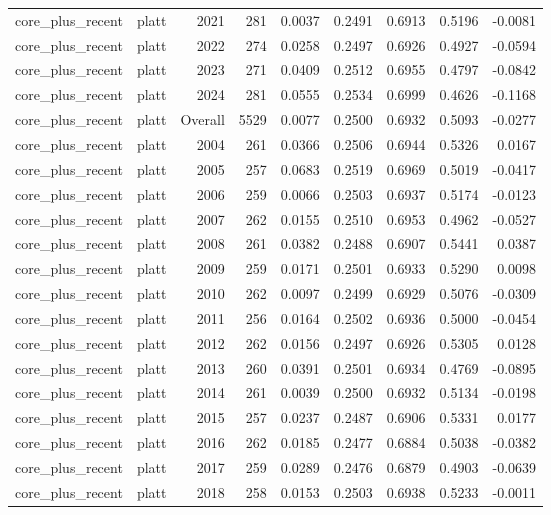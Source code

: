 \begin{table}[t]
\begin{tabular}{@{} l l r r r r r r r @{} }
      core\_plus\_recent & platt & 2021 & 281 & 0.0037 & 0.2491 & 0.6913 & 0.5196 & -0.0081 \\
      core\_plus\_recent & platt & 2022 & 274 & 0.0258 & 0.2497 & 0.6926 & 0.4927 & -0.0594 \\
      core\_plus\_recent & platt & 2023 & 271 & 0.0409 & 0.2512 & 0.6955 & 0.4797 & -0.0842 \\
      core\_plus\_recent & platt & 2024 & 281 & 0.0555 & 0.2534 & 0.6999 & 0.4626 & -0.1168 \\
      core\_plus\_recent & platt & Overall & 5529 & 0.0077 & 0.2500 & 0.6932 & 0.5093 & -0.0277 \\
      core\_plus\_recent & platt & 2004 & 261 & 0.0366 & 0.2506 & 0.6944 & 0.5326 & 0.0167 \\
      core\_plus\_recent & platt & 2005 & 257 & 0.0683 & 0.2519 & 0.6969 & 0.5019 & -0.0417 \\
      core\_plus\_recent & platt & 2006 & 259 & 0.0066 & 0.2503 & 0.6937 & 0.5174 & -0.0123 \\
      core\_plus\_recent & platt & 2007 & 262 & 0.0155 & 0.2510 & 0.6953 & 0.4962 & -0.0527 \\
      core\_plus\_recent & platt & 2008 & 261 & 0.0382 & 0.2488 & 0.6907 & 0.5441 & 0.0387 \\
      core\_plus\_recent & platt & 2009 & 259 & 0.0171 & 0.2501 & 0.6933 & 0.5290 & 0.0098 \\
      core\_plus\_recent & platt & 2010 & 262 & 0.0097 & 0.2499 & 0.6929 & 0.5076 & -0.0309 \\
      core\_plus\_recent & platt & 2011 & 256 & 0.0164 & 0.2502 & 0.6936 & 0.5000 & -0.0454 \\
      core\_plus\_recent & platt & 2012 & 262 & 0.0156 & 0.2497 & 0.6926 & 0.5305 & 0.0128 \\
      core\_plus\_recent & platt & 2013 & 260 & 0.0391 & 0.2501 & 0.6934 & 0.4769 & -0.0895 \\
      core\_plus\_recent & platt & 2014 & 261 & 0.0039 & 0.2500 & 0.6932 & 0.5134 & -0.0198 \\
      core\_plus\_recent & platt & 2015 & 257 & 0.0237 & 0.2487 & 0.6906 & 0.5331 & 0.0177 \\
      core\_plus\_recent & platt & 2016 & 262 & 0.0185 & 0.2477 & 0.6884 & 0.5038 & -0.0382 \\
      core\_plus\_recent & platt & 2017 & 259 & 0.0289 & 0.2476 & 0.6879 & 0.4903 & -0.0639 \\
      core\_plus\_recent & platt & 2018 & 258 & 0.0153 & 0.2503 & 0.6938 & 0.5233 & -0.0011 \\

\end{tabular}
\end{table}
